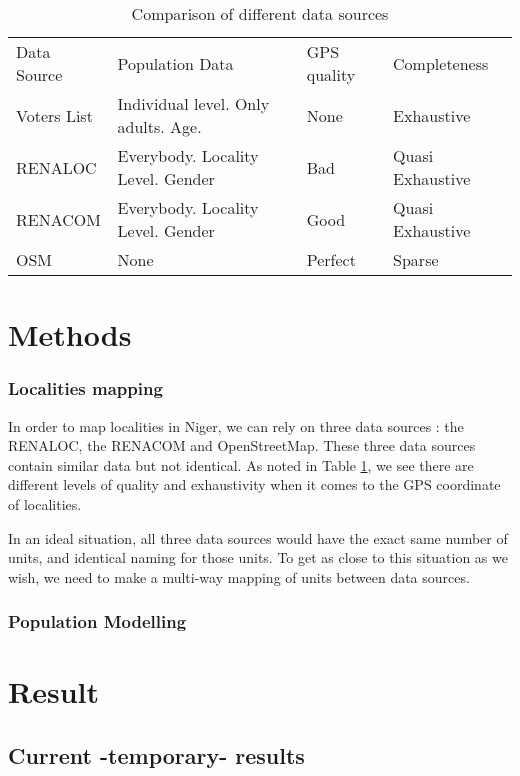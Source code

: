 \documentclass[12pt]{article}\usepackage[]{graphicx}\usepackage[]{color}
\begin{document}
\begin{table}[]
\centering
\caption{Comparison of different data sources}
\label{data_source_comparison}
\begin{tabular}{llll}
 Data Source & Population Data & GPS quality & Completeness  \\
 Voters List & Individual level. Only adults. Age.  & None & Exhaustive  \\
 RENALOC & Everybody. Locality Level. Gender & Bad & Quasi Exhaustive  \\
 RENACOM & Everybody. Locality Level. Gender & Good  & Quasi Exhaustive \\
 OSM     & None & Perfect & Sparse
\end{tabular}
\end{table}



\section{Methods}



\subsubsection{Localities mapping}

In order to map localities in Niger, we can rely on three data sources : the RENALOC, the RENACOM and OpenStreetMap. These three data sources contain similar data but not identical. As noted in Table \ref{data_source_comparison}, we see there are different levels of quality and exhaustivity when it comes to the GPS coordinate of localities.

In an ideal situation, all three data sources would have the exact same number of units, and identical naming for those units. To get as close to this situation as we wish, we need to make a multi-way mapping of units between data sources.

\subsubsection{Population Modelling}


\section{Result}

\subsection{Current -temporary- results}
\end{document}

